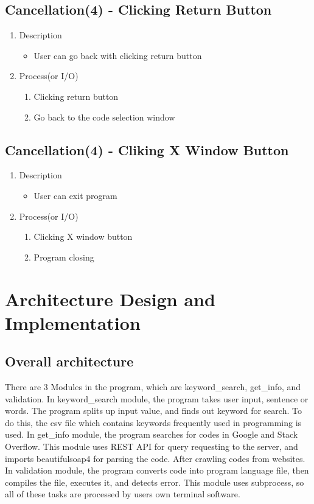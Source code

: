 \documentclass[conference]{IEEEtran}
\begin{document}
\subsection{Cancellation(4) - Clicking Return Button}
\begin{enumerate}
  \item Description
  \begin{itemize}
    \item User can go back with clicking return button
  \end{itemize}
  \item Process(or I/O)
  \begin{enumerate}
    \item Clicking return button
    \item Go back to the code selection window
  \end{enumerate}
\end{enumerate}
\textit{}


\subsection{Cancellation(4) - Cliking X Window Button}
\begin{enumerate}
  \item Description
  \begin{itemize}
    \item User can exit program
  \end{itemize}
  \item Process(or I/O)
  \begin{enumerate}
    \item Clicking X window button
    \item Program closing
  \end{enumerate}
\end{enumerate}
\textit{}

\section{Architecture Design and Implementation} %
\label{sec:architecture_design_and_implementation}

\subsection{Overall architecture} %
\label{sub:overall_architecture}

There are 3 Modules in the program, which are keyword\_search, get\_info, and validation. In keyword\_search module, the program takes user input, sentence or words. The program splits up input value, and finds out keyword for search. To do this, the csv file which contains keywords frequently used in programming is used. In get\_info module, the program searches for codes in Google and Stack Overflow. This module uses REST API for query requesting to the server, and imports beautifulsoap4 for parsing the code. After crawling codes from websites. In validation module, the program converts code into program language file, then compiles the file, executes it, and detects error. This module uses subprocess, so all of these tasks are processed by users own terminal software.
\end{document}

